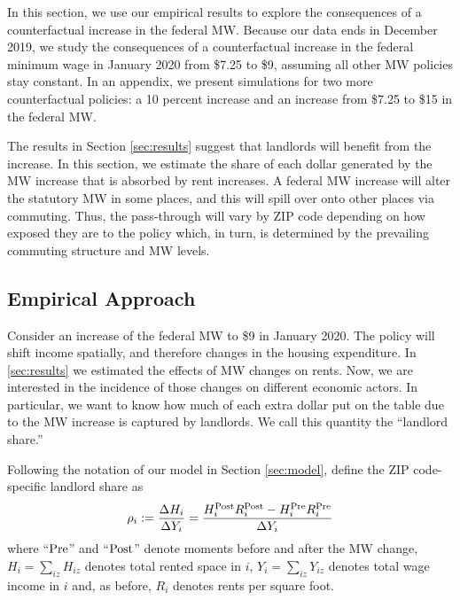 
In this section, we use our empirical results to explore the consequences of 
a counterfactual increase in the federal MW.
Because our data ends in December 2019, we study the consequences of a 
counterfactual increase in the federal minimum wage in January 2020 from 
\$7.25 to \$9, assuming all other MW policies stay constant. 
In an appendix, we present simulations for two more counterfactual policies: 
a 10 percent increase and an increase from \$7.25 to \$15 in the federal MW.

The results in Section \ref{sec:results} suggest that landlords will benefit
from the increase. 
In this section, we estimate the share of each dollar generated by the MW 
increase that is absorbed by rent increases.
A federal MW increase will alter the statutory MW in some places, and this will
spill over onto other places via commuting.
Thus, the pass-through will vary by ZIP code depending on how exposed they
are to the policy which, in turn, is determined by the prevailing commuting
structure and MW levels.


\subsection{Empirical Approach}\label{sec:emp_cf}

Consider an increase of the federal MW to \$9 in January 2020.
The policy will shift income spatially, and therefore changes in 
the housing expenditure.
In \ref{sec:results} we estimated the effects of MW changes on rents.
Now, we are interested in the incidence of those changes on different economic
actors.
In particular, we want to know how much of each extra dollar put on the table 
due to the MW increase is captured by landlords.
We call this quantity the ``landlord share.''

Following the notation of our model in Section \ref{sec:model}, define the 
ZIP code-specific landlord share as
\begin{equation*}
    \rho_i := \frac{\Delta H_i}{\Delta Y_i} 
            = \frac{H^{\text{Post}}_i R^{\text{Post}}_i - H^{\text{Pre}}_i R^{\text{Pre}}_i}{\Delta Y_i} 
\end{equation*}
where
``$\text{Pre}$'' and ``$\text{Post}$'' denote moments before and after the MW change,
$H_i = \sum_{iz} H_{iz}$ denotes total rented space in $i$, 
$Y_i = \sum_{iz} Y_{iz}$ denotes total wage income in $i$ 
and, as before,
$R_i$ denotes rents per square foot.

